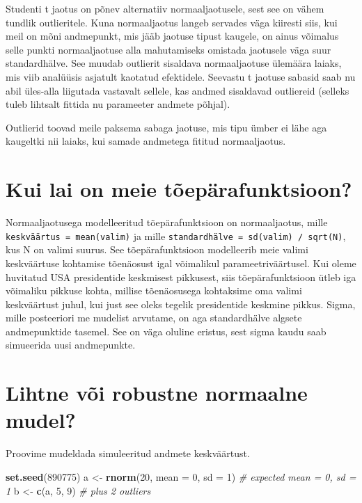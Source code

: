\documentclass[]{book}
\newenvironment{Shaded}{\begin{snugshade}}{\end{snugshade}}
\newcommand{\KeywordTok}[1]{\textcolor[rgb]{0.13,0.29,0.53}{\textbf{#1}}}
\newcommand{\DataTypeTok}[1]{\textcolor[rgb]{0.13,0.29,0.53}{#1}}
\newcommand{\DecValTok}[1]{\textcolor[rgb]{0.00,0.00,0.81}{#1}}
\newcommand{\StringTok}[1]{\textcolor[rgb]{0.31,0.60,0.02}{#1}}
\newcommand{\CommentTok}[1]{\textcolor[rgb]{0.56,0.35,0.01}{\textit{#1}}}
\newcommand{\NormalTok}[1]{#1}
\begin{document}
Studenti t jaotus on põnev alternatiiv normaaljaotusele, sest see on
vähem tundlik outlieritele. Kuna normaaljaotus langeb servades väga
kiiresti siis, kui meil on mõni andmepunkt, mis jääb jaotuse tipust
kaugele, on ainus võimalus selle punkti normaaljaotuse alla mahutamiseks
omistada jaotusele väga suur standardhälve. See muudab outlierit
sisaldava normaaljaotuse ülemäära laiaks, mis viib analüüsis asjatult
kaotatud efektidele. Seevastu t jaotuse sabasid saab nu abil üles-alla
liigutada vastavalt sellele, kas andmed sisaldavad outliereid (selleks
tuleb lihtsalt fittida nu parameeter andmete põhjal).

Outlierid toovad meile paksema sabaga jaotuse, mis tipu ümber ei lähe
aga kaugeltki nii laiaks, kui samade andmetega fititud normaaljaotus.

\section*{Kui lai on meie
tõepärafunktsioon?}\label{kui-lai-on-meie-toeparafunktsioon}

Normaaljaotusega modelleeritud tõepärafunktsioon on normaaljaotus, mille
\texttt{keskväärtus\ =\ mean(valim)} ja mille
\texttt{standardhälve\ =\ sd(valim)\ /\ sqrt(N)}, kus N on valimi
suurus. See tõepärafunktsioon modelleerib meie valimi keskväärtuse
kohtamise tõenäosust igal võimalikul parameetriväärtusel. Kui oleme
huvitatud USA presidentide keskmisest pikkusest, siis tõepärafunktsioon
ütleb iga võimaliku pikkuse kohta, millise tõenäosusega kohtaksime oma
valimi keskväärtust juhul, kui just see oleks tegelik presidentide
keskmine pikkus. Sigma, mille posteeriori me mudelist arvutame, on aga
standardhälve algsete andmepunktide tasemel. See on väga oluline
eristus, sest sigma kaudu saab simueerida uusi andmepunkte.

\section*{Lihtne või robustne normaalne
mudel?}\label{lihtne-voi-robustne-normaalne-mudel}

Proovime mudeldada simuleeritud andmete keskväärtust.

\begin{Shaded}
\begin{Highlighting}[]
\KeywordTok{set.seed}\NormalTok{(}\DecValTok{890775}\NormalTok{)}
\NormalTok{a <-}\StringTok{ }\KeywordTok{rnorm}\NormalTok{(}\DecValTok{20}\NormalTok{, }\DataTypeTok{mean =} \DecValTok{0}\NormalTok{, }\DataTypeTok{sd =} \DecValTok{1}\NormalTok{) }\CommentTok{# expected mean = 0, sd = 1}
\NormalTok{b <-}\StringTok{ }\KeywordTok{c}\NormalTok{(a, }\DecValTok{5}\NormalTok{, }\DecValTok{9}\NormalTok{) }\CommentTok{# plus 2 outliers}
\end{Highlighting}
\end{Shaded}
\end{document}
